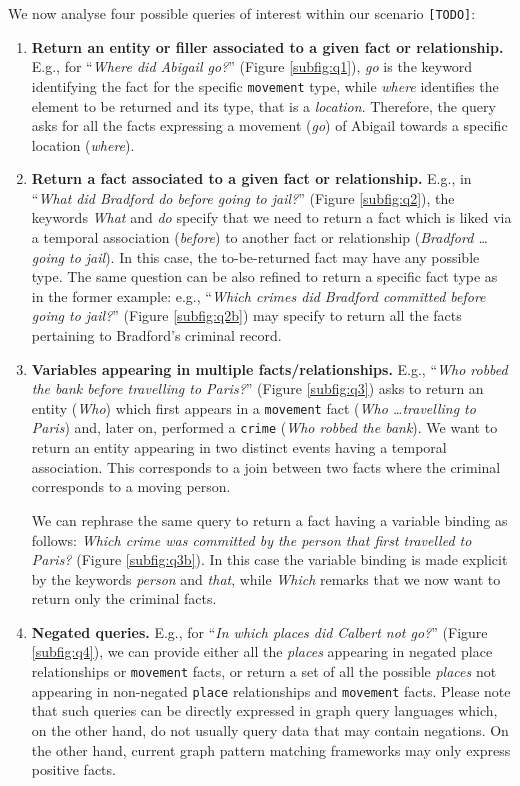 We now analyse four possible queries of interest within our scenario \texttt{[TODO]}:

\begin{enumerate}
\item \textbf{Return an entity or filler associated to a given fact or relationship.} E.g., for ``\textit{Where did Abigail go?}'' (Figure \ref{subfig:q1}), \textit{go} is the keyword identifying the fact for the specific \texttt{movement} type, while \textit{where} identifies the element to be returned and its type, that is a \textit{location}. Therefore, the query asks for all the facts expressing a movement (\textit{go}) of Abigail towards a specific location (\textit{where}). 
\item \textbf{Return a fact associated to a given fact or relationship.} E.g., in ``\textit{What did Bradford do before going to jail?}'' (Figure \ref{subfig:q2}), the keywords \textit{What} and \textit{do} specify that we need to return a fact which is liked via a temporal association (\textit{before}) to another fact or relationship (\textit{Bradford \dots going to jail}). In this case, the to-be-returned fact may have any possible type. The same question can be also refined to return a specific fact type as in the former example: e.g., ``\textit{Which crimes did Bradford committed before going to jail?}'' (Figure \ref{subfig:q2b}) may specify to return all the facts pertaining to Bradford's criminal record.
\item \textbf{Variables appearing in multiple facts/relationships.} E.g., ``\textit{Who robbed the bank before travelling to Paris?}'' (Figure \ref{subfig:q3}) asks to return an entity (\textit{Who}) which first appears in a \texttt{movement} fact (\textit{Who \dots travelling to Paris}) and, later on, performed a \texttt{crime} (\textit{Who robbed the bank}). We want to return an entity  appearing in two distinct events having a temporal association. This corresponds to a join between two facts where the criminal corresponds to a moving person. 

We can rephrase the same query to return a fact having a variable binding as follows: \textit{Which crime was committed by the person that first travelled to Paris?} (Figure \ref{subfig:q3b}). In this case the variable binding is made explicit by the keywords \textit{person} and \textit{that}, while \textit{Which} remarks that we now want to return only the criminal facts.
\item \textbf{Negated queries.} E.g., for ``\textit{In which places did Calbert not go?}'' (Figure \ref{subfig:q4}), we can provide either all the \textit{places} appearing in negated place relationships or \texttt{movement} facts, or return a set of all the possible \textit{places} not appearing in non-negated \texttt{place} relationships and \texttt{movement} facts.  Please note that such queries can be directly expressed in graph query languages which, on the other hand, do not usually query data that may contain negations. On the other hand, current graph pattern matching frameworks may only express positive facts.
\end{enumerate}

